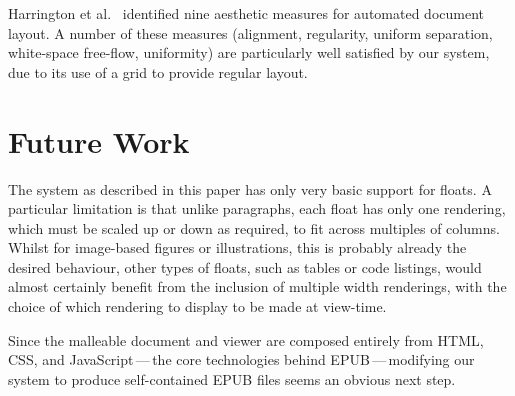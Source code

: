 Harrington et al.~\cite{Harrington2004} identified nine aesthetic measures for automated document layout. A number of these measures (alignment, regularity, uniform separation, white-space free-flow, uniformity) are particularly well satisfied by our system, due to its use of a grid to provide regular layout.

    
    




\section{Future Work}
\label{sec:future}
The system as described in this paper has only very basic support for floats. A particular limitation is that unlike paragraphs, each float has only one rendering, which must be scaled up or down as required, to fit across multiples of columns. Whilst for image-based figures or illustrations, this is probably already the desired behaviour, other types of floats, such as tables or code listings, would almost certainly benefit from the inclusion of multiple width renderings, with the choice of which rendering to display to be made at view-time. %


Since the malleable document and viewer are composed entirely from HTML, CSS, and JavaScript\,---\,the core technologies behind EPUB\,---\,modifying our system to produce self-contained EPUB files seems an obvious next step.

